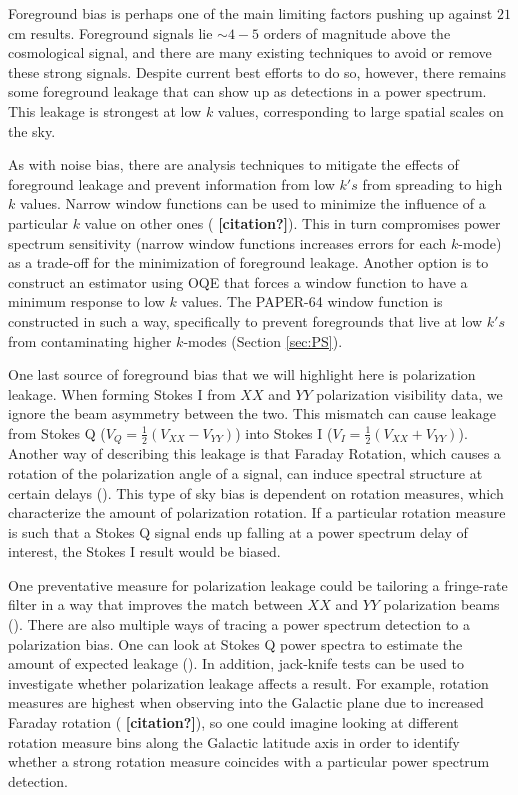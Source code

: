 \documentclass[preprint2,numberedappendix,tighten,twocolappendix]{aastex6}  %
\newcommand{\cc}[1]{{\color{purple} \textbf{[#1]}}}
\begin{document}
Foreground bias is perhaps one of the main limiting factors pushing up against $21$ cm results. Foreground signals lie $\sim4-5$ orders of magnitude above the cosmological signal, and there are many existing techniques to avoid or remove these strong signals. Despite current best efforts to do so, however, there remains some foreground leakage that can show up as detections in a power spectrum. This leakage is strongest at low $k$ values, corresponding to large spatial scales on the sky. 

As with noise bias, there are analysis techniques to mitigate the effects of foreground leakage and prevent information from low $k's$ from spreading to high $k$ values. Narrow window functions can be used to minimize the influence of a particular $k$ value on other ones (\cc{citation?}). This in turn compromises power spectrum sensitivity (narrow window functions increases errors for each $k$-mode) as a trade-off for the minimization of foreground leakage. Another option is to construct an estimator using OQE that forces a window function to have a minimum response to low $k$ values. The PAPER-64 window function is constructed in such a way, specifically to prevent foregrounds that live at low $k's$ from contaminating higher $k$-modes (Section \ref{sec:PS}).

One last source of foreground bias that we will highlight here is polarization leakage. When forming Stokes I from $XX$ and $YY$ polarization visibility data, we ignore the beam asymmetry between the two. This mismatch can cause leakage from Stokes Q ($V_{Q} = \frac{1}{2}(V_{XX}-V_{YY})$) into Stokes I ($V_{I} = \frac{1}{2}(V_{XX}+V_{YY})$). Another way of describing this leakage is that Faraday Rotation, which causes a rotation of the polarization angle of a signal, can induce spectral structure at certain delays (\citealt{moore_et_al2013}). This type of sky bias is dependent on rotation measures, which characterize the amount of polarization rotation. If a particular rotation measure is such that a Stokes Q signal ends up falling at a power spectrum delay of interest, the Stokes I result would be biased. 

One preventative measure for polarization leakage could be tailoring a fringe-rate filter in a way that improves the match between $XX$ and $YY$ polarization beams (\citealt{parsons_et_al2016}). There are also multiple ways of tracing a power spectrum detection to a polarization bias. One can look at Stokes Q power spectra to estimate the amount of expected leakage (\citealt{moore_et_al2013}). In addition, jack-knife tests can be used to investigate whether polarization leakage affects a result. For example, rotation measures are highest when observing into the Galactic plane due to increased Faraday rotation (\cc{citation?}), so one could imagine looking at different rotation measure bins along the Galactic latitude axis in order to identify whether a strong rotation measure coincides with a particular power spectrum detection. 
\end{document}
